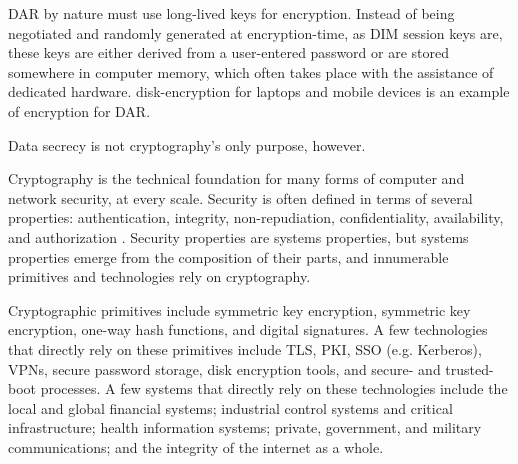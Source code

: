 \Ac{DAR} by nature must use long-lived keys for encryption. Instead of being negotiated and randomly generated at
encryption-time, as \ac{DIM} session keys are, these keys are either derived from a user-entered password or are stored
somewhere in computer memory, which often takes place with the assistance of dedicated hardware. \Ac{disk-encryption}
for laptops and mobile devices is an example of encryption for \ac{DAR}.

Data secrecy is not cryptography's only purpose, however.

Cryptography is the technical foundation for many forms of computer and network security, at every scale. Security is
often defined in terms of several properties: authentication, integrity, non-repudiation, confidentiality, availability,
and authorization \cite{shostack_threat_2014}. Security properties are systems properties, but systems properties emerge
from the composition of their parts, and innumerable primitives and technologies rely on cryptography.


Cryptographic primitives include symmetric key encryption, symmetric key encryption, one-way hash functions, and digital
signatures. A few technologies that directly rely on these primitives include \ac{TLS}, \ac{PKI}, \ac{SSO} (e.g.
Kerberos), \acp{VPN}, secure password storage, disk encryption tools, and secure- and trusted-boot processes. A few
systems that directly rely on these technologies include the local and global financial systems; industrial control
systems and critical infrastructure; health information systems; private, government, and military communications; and
the integrity of the internet as a whole.


